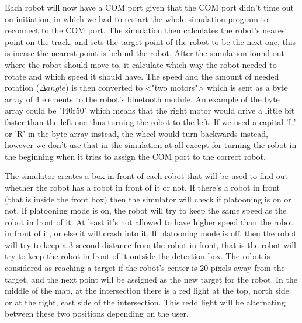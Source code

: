Each robot will now have a COM port given that the COM port didn't time out on initiation, in which we had to restart the whole simulation program to reconnect to the COM port.
The simulation then calculates the robot's nearest point on the track, and sets the target point of the robot to be the next one, this is incase the nearest point is behind the robot. After the simulation found out where the robot should move to, it calculate which way the robot needed to rotate and which speed it should have. The speed and the amount of needed rotation ($\Delta angle$) is then converted to <"two motors"> which is sent as a byte array of 4 elements to the robot's bluetooth module. An example of the byte array could be "l40r50" which means that the right motor would drive a little bit faster than the left one thus turning the robot to the left.
If we used a capital 'L' or 'R' in the byte array instead, the wheel would turn backwards instead, however we don't use that in the simulation at all except for turning the robot in the beginning when it tries to assign the COM port to the correct robot.

The simulator creates a box in front of each robot that will be used to find out whether the robot has a robot in front of it or not. If there's a robot in front (that is inside the front box) then the simulator will check if platooning is on or not. If platooning mode is on, the robot will try to keep the same speed as the robot in front of it. At least it's not allowed to have higher speed than the robot in front of it, or else it will crash into it. If platooning mode is off, then the robot will try to keep a 3 second distance from the robot in front, that is the robot will try to keep the robot in front of it outside the detection box. The robot is considered as reaching a target if the robot's center is 20 pixels away from the target, and the next point will be assigned as the new target for the robot.
In the middle of the map, at the intersection there is a red light at the top, north side or at the right, east side of the intersection. This redd light will be alternating between these two positions depending on the user. 
